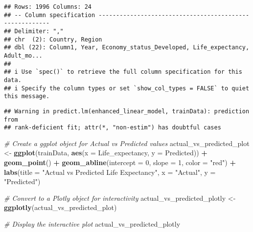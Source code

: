 \documentclass[
]{article}
\newenvironment{Shaded}{\begin{snugshade}}{\end{snugshade}}
\newcommand{\AttributeTok}[1]{\textcolor[rgb]{0.13,0.29,0.53}{#1}}
\newcommand{\CommentTok}[1]{\textcolor[rgb]{0.56,0.35,0.01}{\textit{#1}}}
\newcommand{\DecValTok}[1]{\textcolor[rgb]{0.00,0.00,0.81}{#1}}
\newcommand{\FunctionTok}[1]{\textcolor[rgb]{0.13,0.29,0.53}{\textbf{#1}}}
\newcommand{\NormalTok}[1]{#1}
\newcommand{\OtherTok}[1]{\textcolor[rgb]{0.56,0.35,0.01}{#1}}
\newcommand{\SpecialCharTok}[1]{\textcolor[rgb]{0.81,0.36,0.00}{\textbf{#1}}}
\newcommand{\StringTok}[1]{\textcolor[rgb]{0.31,0.60,0.02}{#1}}
\begin{document}
\begin{verbatim}
## Rows: 1996 Columns: 24
## -- Column specification --------------------------------------------------------
## Delimiter: ","
## chr  (2): Country, Region
## dbl (22): Column1, Year, Economy_status_Developed, Life_expectancy, Adult_mo...
## 
## i Use `spec()` to retrieve the full column specification for this data.
## i Specify the column types or set `show_col_types = FALSE` to quiet this message.
\end{verbatim}

\begin{Shaded}
\end{Shaded}

\begin{verbatim}
## Warning in predict.lm(enhanced_linear_model, trainData): prediction from
## rank-deficient fit; attr(*, "non-estim") has doubtful cases
\end{verbatim}

\begin{Shaded}
\begin{Highlighting}[]
\CommentTok{\# Create a ggplot object for Actual vs Predicted values}
\NormalTok{actual\_vs\_predicted\_plot }\OtherTok{\textless{}{-}} \FunctionTok{ggplot}\NormalTok{(trainData, }\FunctionTok{aes}\NormalTok{(}\AttributeTok{x =}\NormalTok{ Life\_expectancy, }\AttributeTok{y =}\NormalTok{ Predicted)) }\SpecialCharTok{+}
  \FunctionTok{geom\_point}\NormalTok{() }\SpecialCharTok{+}
  \FunctionTok{geom\_abline}\NormalTok{(}\AttributeTok{intercept =} \DecValTok{0}\NormalTok{, }\AttributeTok{slope =} \DecValTok{1}\NormalTok{, }\AttributeTok{color =} \StringTok{"red"}\NormalTok{) }\SpecialCharTok{+}
  \FunctionTok{labs}\NormalTok{(}\AttributeTok{title =} \StringTok{"Actual vs Predicted Life Expectancy"}\NormalTok{, }\AttributeTok{x =} \StringTok{"Actual"}\NormalTok{, }\AttributeTok{y =} \StringTok{"Predicted"}\NormalTok{)}

\CommentTok{\# Convert to a Plotly object for interactivity}
\NormalTok{actual\_vs\_predicted\_plotly }\OtherTok{\textless{}{-}} \FunctionTok{ggplotly}\NormalTok{(actual\_vs\_predicted\_plot)}

\CommentTok{\# Display the interactive plot}
\NormalTok{actual\_vs\_predicted\_plotly}
\end{Highlighting}
\end{Shaded}
\end{document}
